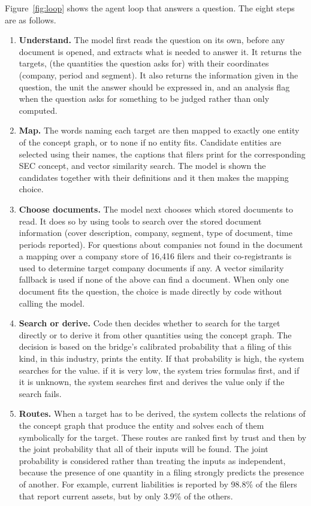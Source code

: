 Figure~\ref{fig:loop} shows the agent loop that answers a question. The eight steps are as follows.
\begin{enumerate}[label=(\arabic*)]
  \item \textbf{Understand.} The model first reads the question on its own, before any document is opened, and extracts what is needed to answer it. It returns the targets, (the quantities the question asks for) with their coordinates (company, period and segment). It also returns the information given in the question, the unit the answer should be expressed in, and an analysis flag when the question asks for something to be judged rather than only computed.
  \item \textbf{Map.} The words naming each target are then mapped to exactly one entity of the concept graph, or to none if no entity fits. Candidate entities are selected using their names, the captions that filers print for the corresponding SEC concept, and vector similarity search. The model is shown the candidates together with their definitions and it then makes the mapping choice.
  \item \textbf{Choose documents.} The model next chooses which stored documents to read. It does so by using tools to search over the stored document information (cover description, company, segment, type of document, time periods reported). For questions about companies not found in the document a mapping over a company store of 16,416 filers and their co-registrants is used to determine target company documents if any. A vector similarity fallback is used if none of the above can find a document. When only one document fits the question, the choice is made directly by code without calling the model.
  \item \textbf{Search or derive.} Code then decides whether to search for the target directly or to derive it from other quantities using the concept graph. The decision is based on the bridge's calibrated probability that a filing of this kind, in this industry, prints the entity. If that probability is high, the system searches for the value. if it is very low, the system tries formulas first, and if it is unknown, the system searches first and derives the value only if the search fails.
  \item \textbf{Routes.} When a target has to be derived, the system collects the relations of the concept graph that produce the entity and solves each of them symbolically for the target. These routes are ranked first by trust and then by the joint probability that all of their inputs will be found. The joint probability is considered rather than treating the inputs as independent, because the presence of one quantity in a filing strongly predicts the presence of another. For example, current liabilities is reported by 98.8\% of the filers that report current assets, but by only 3.9\% of the others.

\end{enumerate}
